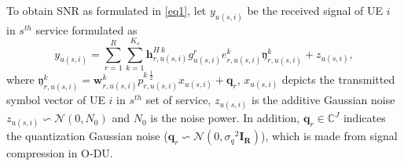 \documentclass[conference]{IEEEtran}
\begin{document}
To obtain SNR as formulated in \eqref{eq1}, let $y_{u(s,i)} $ be the received signal of UE $i$ in $s^{th}$ service formulated as
\begin{equation}\label{eq2}
y_{u(s,i)} = \sum_{r = 1}^{R}\sum_{k=1}^{K_s} \boldsymbol{h}^{H \: k}_{r,u(s,i)} g_{u(s,i)}^r e^k_{r,u(s,i)}\mathfrak{y}^k_{r,u(s,i)}+ z_{u(s,i)},
\end{equation}
where $\mathfrak{y}^k_{r,u(s,i)} =\boldsymbol{w}^k_{r,u(s,i)}{p^{k \: \frac{1}{2}}_{r,u(s,i)}} x_{u(s,i)}+ \boldsymbol{q}_{r}$, $ x_{u(s,i)}$ depicts the transmitted symbol vector of UE $i$ in $s^{th}$ set of service,  $z_{u(s,i)}$ is the additive Gaussian noise $z_{u(s,i)} \backsim \mathcal{N}(0,N_0)$ and $N_0$ is the noise power.
In addition, $\boldsymbol{q}_{r} \in \mathbb{C}^{J }  $ indicates the quantization Gaussian noise 
($\boldsymbol{q}_{r} \backsim \mathcal{N}(0,{\sigma_q}^2\boldsymbol{I_{R}} )$), which is made from signal compression in O-DU.
\end{document}
